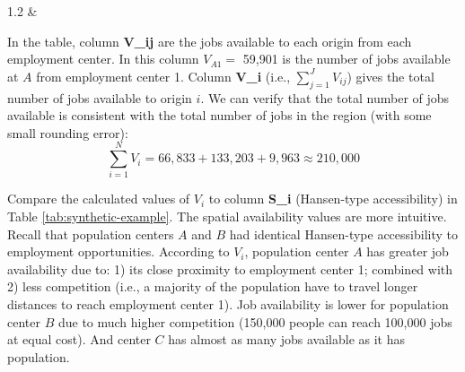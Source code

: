 \documentclass[]{elsarticle} %
\begin{document}
\begin{table}[ht]
\begin{centerbox}
\begin{threeparttable}
\begin{tabularx}{1.2\textwidth}
 &
 \tabularnewline[-0.5pt]


\end{tabularx}
\end{threeparttable}\par\end{centerbox}

\end{table}
 

In the table, column \textbf{V\_ij} are the jobs available to each
origin from each employment center. In this column \(V_{A1}=\) 59,901 is
the number of jobs available at \(A\) from employment center 1. Column
\textbf{V\_i} (i.e., \(\sum_{j=1}^JV_{ij}\)) gives the total number of
jobs available to origin \(i\). We can verify that the total number of
jobs available is consistent with the total number of jobs in the region
(with some small rounding error): \[
\sum_{i=1}^N V_i = 66,833 + 133,203 + 9,963 \approx 210,000 
\]

Compare the calculated values of \(V_i\) to column \textbf{S\_i}
(Hansen-type accessibility) in Table \ref{tab:synthetic-example}. The
spatial availability values are more intuitive. Recall that population
centers \(A\) and \(B\) had identical Hansen-type accessibility to
employment opportunities. According to \(V_i\), population center \(A\)
has greater job availability due to: 1) its close proximity to
employment center 1; combined with 2) less competition (i.e., a majority
of the population have to travel longer distances to reach employment
center 1). Job availability is lower for population center \(B\) due to
much higher competition (150,000 people can reach 100,000 jobs at equal
cost). And center \(C\) has almost as many jobs available as it has
population.
\end{document}
